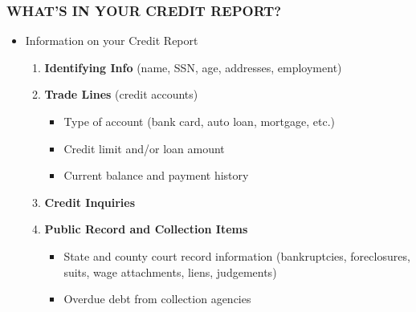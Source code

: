\documentclass[12pt]{article}
\begin{document}
            \subsubsection{WHAT'S IN YOUR CREDIT REPORT?}
                \begin{itemize}
                    \item Information on your Credit Report
                        \begin{enumerate}
                            \item \textbf{Identifying Info} (name, SSN, age, addresses, employment)
                            \item \textbf{Trade Lines} (credit accounts)
                                \begin{itemize}
                                    \item Type of account (bank card, auto loan, mortgage, etc.)
                                    \item Credit limit and/or loan amount
                                    \item Current balance and payment history
                                \end{itemize}
                            \item \textbf{Credit Inquiries}
                            \item \textbf{Public Record and Collection Items}
                                \begin{itemize}
                                    \item State and county court record information (bankruptcies, foreclosures, suits, wage attachments,
                                        liens, judgements)
                                    \item Overdue debt from collection agencies
                                \end{itemize}
                        \end{enumerate}
                \end{itemize}
\end{document}
